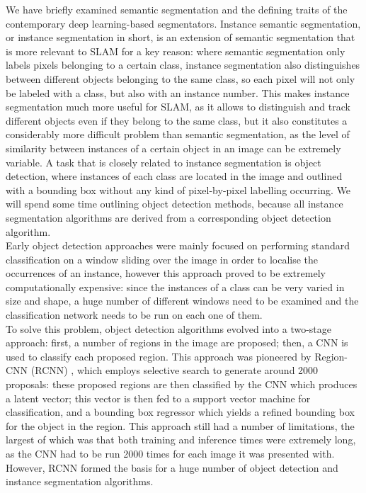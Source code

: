 \documentclass[12pt,twoside]{report}
\begin{document}
We have briefly examined semantic segmentation and the defining traits of the contemporary deep learning-based segmentators. Instance semantic segmentation, or instance segmentation in short, is an extension of semantic segmentation that is more relevant to SLAM for a key reason: where semantic segmentation only labels pixels belonging to a certain class, instance segmentation also distinguishes between different objects belonging to the same class, so each pixel will not only be labeled with a class, but also with an instance number. This makes instance segmentation much more useful for SLAM, as it allows to distinguish and track different objects even if they belong to the same class, but it also constitutes a considerably more difficult problem than semantic segmentation, as the level of similarity between instances of a certain object in an image can be extremely variable. A task that is closely related to instance segmentation is object detection, where instances of each class are located in the image and outlined with a bounding box without any kind of pixel-by-pixel labelling occurring. We will spend some time outlining object detection methods, because all instance segmentation algorithms are derived from a corresponding object detection algorithm.
\\

Early object detection approaches were mainly focused on performing standard classification on a window sliding over the image in order to localise the occurrences of an instance, however this approach proved to be extremely computationally expensive: since the instances of a class can be very varied in size and shape, a huge number of different windows need to be examined and the classification network needs to be run on each one of them.
\\

To solve this problem, object detection algorithms evolved into a two-stage approach: first, a number of regions in the image are proposed; then, a CNN is used to classify each proposed region. This approach was pioneered by Region-CNN (RCNN) \cite{rcnn}, which employs selective search to generate around 2000 proposals: these proposed regions are then classified by the CNN which produces a latent vector; this vector is then fed to a support vector machine for classification, and a bounding box regressor which yields a refined bounding box for the object in the region. This approach still had a number of limitations, the largest of which was that both training and inference times were extremely long, as the CNN had to be run 2000 times for each image it was presented with. However, RCNN formed the basis for a huge number of object detection and instance segmentation algorithms.
\\
\end{document}
